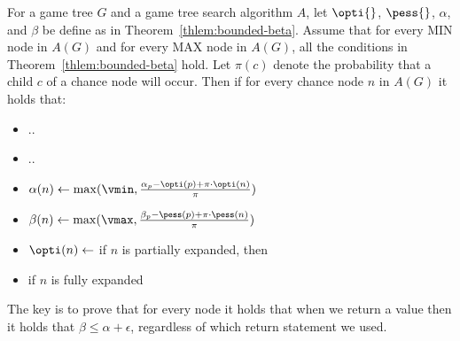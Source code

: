 \begin{theorem}
For a game tree $G$ and a game tree search algorithm $A$, let $\opti{}$, $\pess{}$, $\alpha$, and $\beta$ be define as in Theorem~\ref{thlem:bounded-beta}. Assume that for every MIN node  in $A(G)$ and for every MAX node in $A(G)$, all the conditions in Theorem~\ref{thlem:bounded-beta} hold. 
Let $\pi(c)$ denote the probability that a child $c$ of a chance node will occur. 
Then if for every chance node $n$ in $A(G)$ it holds that:
\begin{itemize}
  \item .. 
  \item ..  
\item $\alpha(n)\gets \max(\vmin, \frac{\alpha_p-\opti(p)+\pi\cdot\opti(n)}{\pi})$
\item $\beta(n)\gets \max(\vmax, \frac{\beta_p-\pess(p)+\pi\cdot\pess(n)}{\pi})$
\item $\opti(n)\gets$ 
if $n$ is partially expanded, then 
$$
$$
\item if $n$ is fully expanded 
\end{itemize}
\end{theorem}




The key is to prove that for every node it holds that 
when we return a value then it holds that $\beta\leq \alpha+\epsilon$, 
regardless of which return statement we used. 



